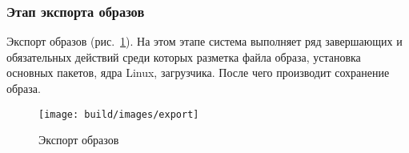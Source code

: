 \newpage
\subsubsection{Этап экспорта образов}
Экспорт образов (рис.~\ref{fig: export}). На этом этапе система выполняет ряд завершающих и обязательных действий среди которых разметка файла образа,
установка основных пакетов, ядра Linux, загрузчика. После чего производит сохранение образа.
\begin{figure}[h!]
  \centering
  \setlength{\fboxsep}{5pt}
  \texttt{[image: build/images/export]}
  \caption{Экспорт образов}\label{fig: export}
\end{figure}
\newpage
